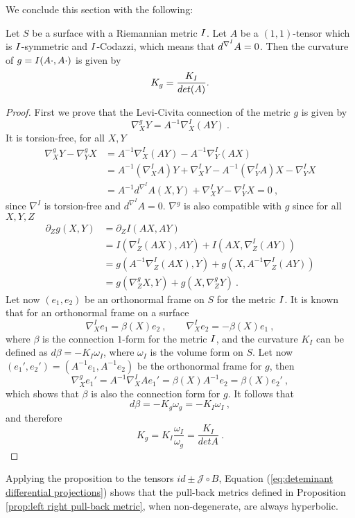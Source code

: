 We conclude this section with the following:

\begin{proposition} \label{prop:Gaussian curvature}
    Let $S$ be a surface with a Riemannian metric $I$. Let $A$ be a $(1,1)$-tensor which is $I$-symmetric and $I$-Codazzi, which means that $d^{\nabla^{I}} A=0$. Then the curvature of $g= I(A \cdot, A \cdot)$ is given by
    \[
        K_g = \frac{K_I}{det(A)}.
    \]
\end{proposition}
\begin{proof}
    First we prove that the Levi-Civita connection of the metric $g$ is given by
    \[
        \nabla^g_X Y = A^{-1} \nabla^I_X(AY) \ .
    \]
    It is torsion-free, for all $X,Y$
    \[
    \begin{split}
        \nabla^g_X Y - \nabla^g_Y X & =  A^{-1} \nabla^I_X(AY) - A^{-1} \nabla^I_Y(AX) \\
        & = A^{-1} (\nabla^I_XA)Y + \nabla^I_X Y - A^{-1} (\nabla^I_YA)X - \nabla^I_Y X  \\
        & = A^{-1} d^{\nabla^I}A(X,Y) +  \nabla^I_X Y - \nabla^I_Y X = 0 \ ,
    \end{split}
    \]
    since $\nabla^I$ is torsion-free and $d^{\nabla^I}A = 0$. $\nabla^g$ is also compatible with $g$ since for all $X,Y,Z$
    \[
    \begin{split}
        \partial_Z g(X,Y) & = \partial_Z I(AX,AY) \\
        & = I(\nabla^I_Z(AX),AY) + I(AX,\nabla^I_Z(AY)) \\
        & = g(A^{-1}\nabla^I_Z(AX),Y) + g(X,A^{-1}\nabla^I_Z(AY)) \\
        & = g(\nabla^g_Z X,Y) + g(X, \nabla^g_Z Y) \ .
    \end{split}
    \]
    Let now $(e_1, e_2)$ be an orthonormal frame on $S$ for the metric $I$. It is known that for an orthonormal frame on a surface
    \[
        \nabla^I_X e_1 = \beta(X)e_2 \ , \qquad \nabla^I_X e_2 = -\beta(X)e_1 \ ,
    \]
    where $\beta$ is the connection $1$-form for the metric $I$, and the curvature $K_I$ can be defined as $d\beta = -K_I \omega_I$, where $\omega_I$ is the volume form on $S$. Let now $(e_1', e_2') = (A^{-1} e_1, A^{-1} e_2)$ be the orthonormal frame for $g$, then
    \[
        \nabla^g_X e_1' = A^{-1} \nabla^I_X Ae_1' = \beta(X) A^{-1} e_2 = \beta(X) e_2' \ ,
    \]
    which shows that $\beta$ is also the connection form for $g$. It follows that 
    \[
        d\beta = - K_g \omega_g = - K_I \omega_I \ ,
    \]
    and therefore
    \[
        K_g = K_I \frac{\omega_I}{\omega_g} = \frac{K_I}{det A} \ .
    \]
\end{proof}
Applying the proposition to the tensors $id \pm \mathcal{J} \circ B$, Equation (\ref{eq:deteminant differential projections}) shows that the pull-back metrics defined in Proposition \ref{prop:left right pull-back metric}, when non-degenerate, are always hyperbolic.
